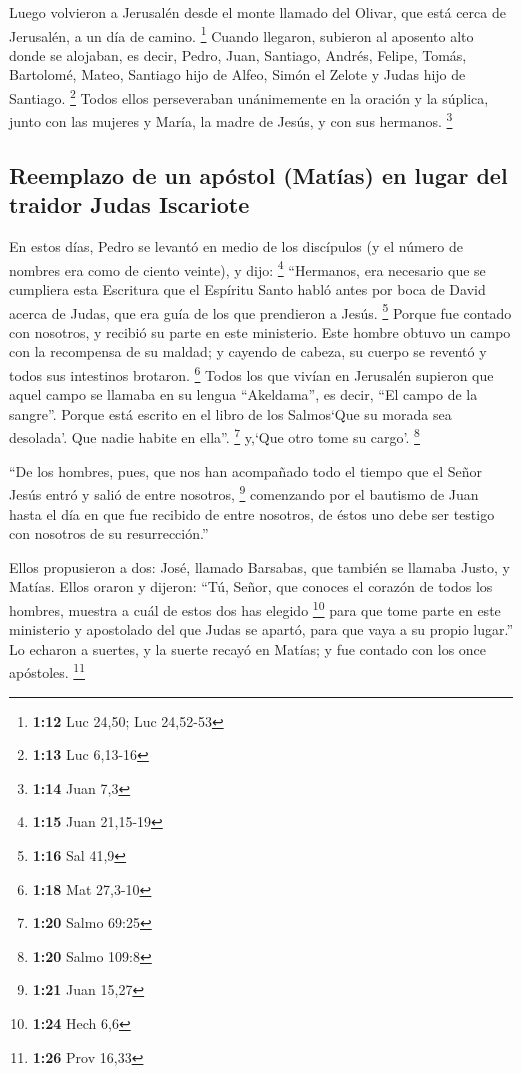  Luego volvieron a Jerusalén desde el monte llamado del
Olivar, que está cerca de Jerusalén, a un día de camino. \footnote{\textbf{1:12}
  Luc 24,50; Luc 24,52-53}  Cuando llegaron, subieron al
aposento alto donde se alojaban, es decir, Pedro, Juan, Santiago,
Andrés, Felipe, Tomás, Bartolomé, Mateo, Santiago hijo de Alfeo, Simón
el Zelote y Judas hijo de Santiago. \footnote{\textbf{1:13} Luc 6,13-16}
 Todos ellos perseveraban unánimemente en la oración y la
súplica, junto con las mujeres y María, la madre de Jesús, y con sus
hermanos. \footnote{\textbf{1:14} Juan 7,3}

\hypertarget{reemplazo-de-un-apuxf3stol-matuxedas-en-lugar-del-traidor-judas-iscariote}{%
\subsection{Reemplazo de un apóstol (Matías) en lugar del traidor Judas
Iscariote}\label{reemplazo-de-un-apuxf3stol-matuxedas-en-lugar-del-traidor-judas-iscariote}}

 En estos días, Pedro se levantó en medio de los
discípulos (y el número de nombres era como de ciento veinte), y dijo:
\footnote{\textbf{1:15} Juan 21,15-19}  ``Hermanos, era
necesario que se cumpliera esta Escritura que el Espíritu Santo habló
antes por boca de David acerca de Judas, que era guía de los que
prendieron a Jesús. \footnote{\textbf{1:16} Sal 41,9} 
Porque fue contado con nosotros, y recibió su parte en este ministerio.
 Este hombre obtuvo un campo con la recompensa de su
maldad; y cayendo de cabeza, su cuerpo se reventó y todos sus intestinos
brotaron. \footnote{\textbf{1:18} Mat 27,3-10}  Todos los
que vivían en Jerusalén supieron que aquel campo se llamaba en su lengua
``Akeldama'', es decir, ``El campo de la sangre''. 
Porque está escrito en el libro de los Salmos`Que su morada sea
desolada'. Que nadie habite en ella''. \footnote{\textbf{1:20} Salmo
  69:25} y,`Que otro tome su cargo'. \footnote{\textbf{1:20} Salmo 109:8}

 ``De los hombres, pues, que nos han acompañado todo el
tiempo que el Señor Jesús entró y salió de entre nosotros, \footnote{\textbf{1:21}
  Juan 15,27}  comenzando por el bautismo de Juan hasta
el día en que fue recibido de entre nosotros, de éstos uno debe ser
testigo con nosotros de su resurrección.''

 Ellos propusieron a dos: José, llamado Barsabas, que
también se llamaba Justo, y Matías.  Ellos oraron y
dijeron: ``Tú, Señor, que conoces el corazón de todos los hombres,
muestra a cuál de estos dos has elegido \footnote{\textbf{1:24} Hech 6,6}
 para que tome parte en este ministerio y apostolado del
que Judas se apartó, para que vaya a su propio lugar.'' 
Lo echaron a suertes, y la suerte recayó en Matías; y fue contado con
los once apóstoles. \footnote{\textbf{1:26} Prov 16,33}

